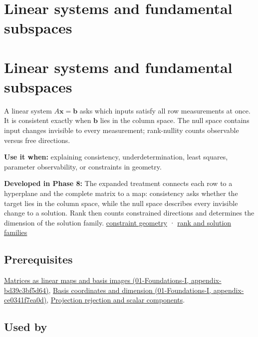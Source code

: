 \hypertarget{appendix-8572a4a060c1}{}
\section*{Linear systems and fundamental subspaces}
\section{Linear systems and fundamental subspaces}\label{linear-systems-and-fundamental-subspaces}

A linear system \(A\mathbf x=\mathbf b\) asks which inputs satisfy all row measurements at once. It is consistent exactly when \(\mathbf b\) lies in the column space. The null space contains input changes invisible to every measurement; rank-nullity counts observable versus free directions.

\textbf{Use it when:} explaining consistency, underdetermination, least squares, parameter observability, or constraints in geometry.

\textbf{Developed in Phase 8:} The expanded treatment connects each row to a hyperplane and the complete matrix to a map: consistency asks whether the target lies in the column space, while the null space describes every invisible change to a solution. Rank then counts constrained directions and determines the dimension of the solution family. \href{Continuous\%20Notes/Computing\%20Foundations\%20-\%20From\%20Bits\%20to\%20C++\%20and\%20Systems\%20APIs\#A\%20system\%20is\%20an\%20intersection\%20of\%20constraints}{constraint geometry} · \href{Continuous\%20Notes/Computing\%20Foundations\%20-\%20From\%20Bits\%20to\%20C++\%20and\%20Systems\%20APIs\#Rank,\%20the\%20four\%20spaces,\%20and\%20the\%20shape\%20of\%20the\%20answer}{rank and solution families}

\subsection{Prerequisites}\label{prerequisites}

\href{}{Matrices as linear maps and basis images (01-Foundations-I, appendix-bd39c3bf5d64)}, \href{}{Basis coordinates and dimension (01-Foundations-I, appendix-ce0341f7ea0d)}, \hyperref[appendix-505a502c372a]{Projection rejection and scalar components}.

\subsection{Used by}\label{used-by}

